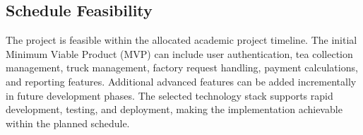 \subsection{Schedule Feasibility}
The project is feasible within the allocated academic project timeline. The initial Minimum Viable Product (MVP) can include user authentication, tea collection management, truck management, factory request handling, payment calculations, and reporting features. Additional advanced features can be added incrementally in future development phases. The selected technology stack supports rapid development, testing, and deployment, making the implementation achievable within the planned schedule.